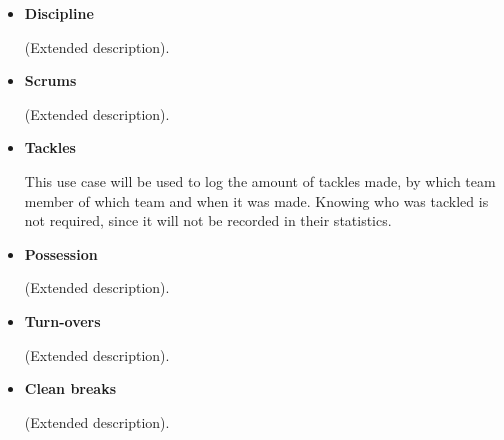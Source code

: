 \documentclass[a4paper,12pt]{report}
\begin{document}
\begin{itemize}
\begin{center}
		\end{center}
	\item \textbf{Discipline}
		\begin{flushleft}
		(Extended description).
		\end{flushleft}
		\begin{center}
		\end{center}
	\item \textbf{Scrums}
		\begin{flushleft}
		(Extended description).
		\end{flushleft}
		\begin{center}
		\end{center}
	\item \textbf{Tackles}
		\begin{flushleft}
			This use case will be used to log the amount of tackles made, by which team member of which team and when it was made. Knowing who was tackled is not required, since it will not be recorded in their statistics.
		\end{flushleft}
		\begin{center}
		\end{center}
	\item \textbf{Possession}
		\begin{flushleft}
		(Extended description).
		\end{flushleft}
		\begin{center}
		\end{center}
	\item \textbf{Turn-overs}
		\begin{flushleft}
		(Extended description).
		\end{flushleft}
		\begin{center}
		\end{center}
	\item \textbf{Clean breaks}
		\begin{flushleft}
		(Extended description).

\end{flushleft}
\end{itemize}
\end{document}

